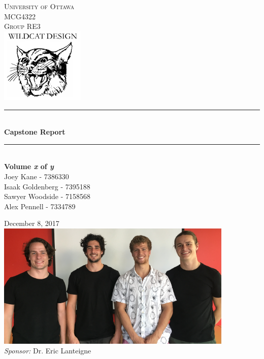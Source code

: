 \documentclass[]{book}
\newcommand{\reporttitle}{Capstone Report}
\begin{document}
\begin{titlepage}
\newcommand{\HRule}{\rule{\linewidth}{0.5mm}}
\center
 
\textsc{\LARGE University of Ottawa}\\
\textsc{\Large MCG4322}\\
\textsc{\large Group RE3}\\[0.2cm]

\includegraphics[width=0.3\textwidth]{img/general/wDesign.png}

\HRule \\[0.4cm]
{\huge \bfseries \reporttitle{}}\\
\HRule\\ 

\Large \textbf{Volume \textit{x} of \textit{y}} \\

\singlespacing
\Large Joey Kane - 7386330\\
Isaak Goldenberg - 7395188\\
Sawyer Woodside - 7158568\\
Alex Pennell - 7334789\\[0.4cm]

\linespread{1.5}

{\large December 8, 2017}\\[0.25cm] %

\includegraphics[width=0.85\textwidth]{img/general/boys.PNG}\\[0.25cm]

\large \emph{Sponsor:} Dr. Eric Lanteigne

\vfill
\end{titlepage}
\end{document}
